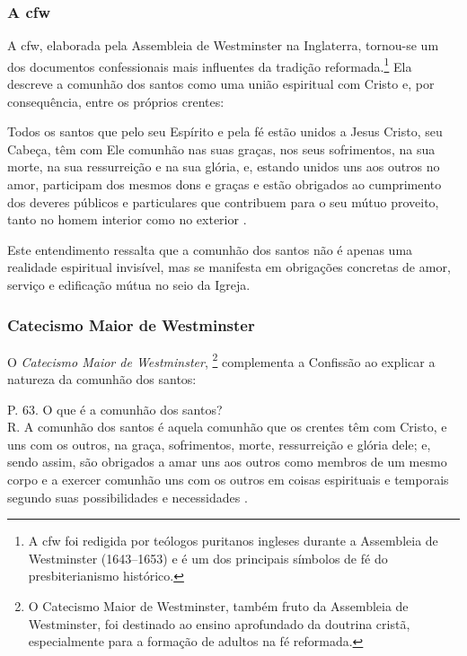 \subsubsection{A \gls{cfw}} 
A \gls{cfw}, elaborada pela Assembleia de Westminster na Inglaterra, tornou-se um dos documentos confessionais mais influentes da tradição reformada.\footnote{A \gls{cfw} foi redigida por teólogos puritanos ingleses durante a Assembleia de Westminster (1643–1653) e é um dos principais símbolos de fé do presbiterianismo histórico.} Ela descreve a comunhão dos santos como uma união espiritual com Cristo e, por consequência, entre os próprios crentes:
\begin{citacao}
Todos os santos que pelo seu Espírito e pela fé estão unidos a Jesus Cristo, seu Cabeça, têm com Ele comunhão nas suas graças, nos seus sofrimentos, na sua morte, na sua ressurreição e na sua glória, e, estando unidos uns aos outros no amor, participam dos mesmos dons e graças e estão obrigados ao cumprimento dos deveres públicos e particulares que contribuem para o seu mútuo proveito, tanto no homem interior como no exterior \cite[Cap.~XXVI, §~1º]{cfw}.
\end{citacao}

Este entendimento ressalta que a comunhão dos santos não é apenas uma realidade espiritual invisível, mas se manifesta em obrigações concretas de amor, serviço e edificação mútua no seio da Igreja.

\subsubsection{Catecismo Maior de Westminster}
O \textit{Catecismo Maior de Westminster}, \footnote{O Catecismo Maior de Westminster, também fruto da Assembleia de Westminster, foi destinado ao ensino aprofundado da doutrina cristã, especialmente para a formação de adultos na fé reformada.} complementa a Confissão ao explicar a natureza da comunhão dos santos:
\begin{citacao}
P. 63. O que é a comunhão dos santos?\\
R. A comunhão dos santos é aquela comunhão que os crentes têm com Cristo, e uns com os outros, na graça, sofrimentos, morte, ressurreição e glória dele; e, sendo assim, são obrigados a amar uns aos outros como membros de um mesmo corpo e a exercer comunhão uns com os outros em coisas espirituais e temporais segundo suas possibilidades e necessidades \cite{catecismoMaior}.
\end{citacao}

